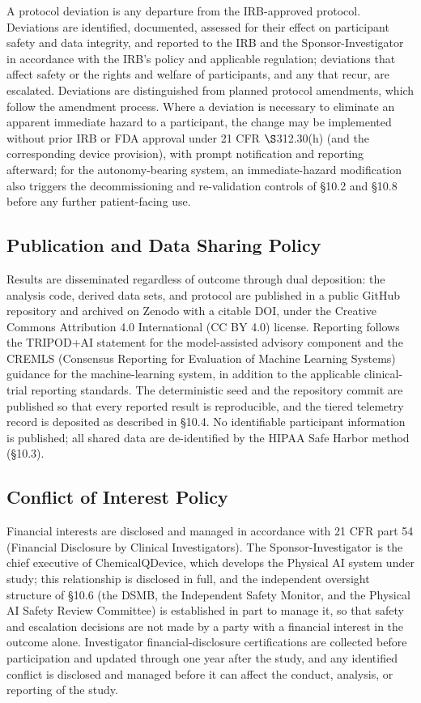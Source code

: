 A protocol deviation is any departure from the IRB-approved protocol. Deviations
are identified, documented, assessed for their effect on participant safety and
data integrity, and reported to the IRB and the Sponsor-Investigator in accordance
with the IRB's policy and applicable regulation; deviations that affect safety or
the rights and welfare of participants, and any that recur, are escalated.
Deviations are distinguished from planned protocol amendments, which follow the
amendment process. Where a deviation is necessary to eliminate an apparent
immediate hazard to a participant, the change may be implemented without prior IRB
or FDA approval under 21 CFR $\S$312.30(h) (and the corresponding device
provision), with prompt notification and reporting afterward; for the
autonomy-bearing system, an immediate-hazard modification also triggers the
decommissioning and re-validation controls of \S10.2 and \S10.8 before any further
patient-facing use.

\subsection{Publication and Data Sharing Policy}

Results are disseminated regardless of outcome through dual deposition: the
analysis code, derived data sets, and protocol are published in a public GitHub
repository and archived on Zenodo with a citable DOI, under the Creative Commons
Attribution 4.0 International (CC BY 4.0) license. Reporting follows the TRIPOD+AI
statement for the model-assisted advisory component \cite{Collins2024tripodai} and
the CREMLS (Consensus Reporting for Evaluation of Machine Learning Systems)
guidance for the machine-learning system, in addition to the applicable
clinical-trial reporting standards. The deterministic seed and the repository
commit are published so that every reported result is reproducible, and the tiered
telemetry record is deposited as described in \S10.4. No identifiable participant
information is published; all shared data are de-identified by the HIPAA Safe
Harbor method (\S10.3).

\subsection{Conflict of Interest Policy}

Financial interests are disclosed and managed in accordance with 21 CFR part 54
(Financial Disclosure by Clinical Investigators). The Sponsor-Investigator is the
chief executive of ChemicalQDevice, which develops the Physical AI system under
study; this relationship is disclosed in full, and the independent oversight
structure of \S10.6 (the DSMB, the Independent Safety Monitor, and the Physical AI
Safety Review Committee) is established in part to manage it, so that safety and
escalation decisions are not made by a party with a financial interest in the
outcome alone. Investigator financial-disclosure certifications are collected
before participation and updated through one year after the study, and any
identified conflict is disclosed and managed before it can affect the conduct,
analysis, or reporting of the study.
